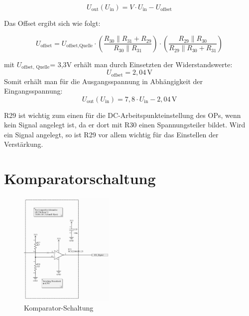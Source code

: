 \begin{equation}
    U_{\text{out}}(U_{\text{in}}) = V \cdot U_{\text{in}} - U_{\text{offset}}
\end{equation}

Das Offset ergibt sich wie folgt:

\begin{equation}
    U_{\text{offset}} = U_{\text{offset,Quelle}} \cdot \left( \frac{R_{30} \parallel R_{31} + R_{29}}{R_{30} \parallel R_{31}} \right) \cdot \left( \frac{R_{29} \parallel R_{30}}{R_{29} \parallel R_{30} + R_{31}} \right)
\end{equation}

mit $U_{\text{offset, Quelle}}$= 3,3V erhält man durch Einsetzten der Widerstandswerte:
\begin{equation}
    U_{\text{offset}} = 2{,}04\,\mathrm{V}
\end{equation}
Somit erhält man für die Ausgangsspannung in Abhängigkeit der Eingangsspannung:
\begin{equation}
    U_{\text{out}}(U_{\text{in}}) = 7{,}8 \cdot U_{\text{in}} - 2{,}04\,\mathrm{V}
\end{equation}





R29 ist wichtig zum einen für die DC-Arbeitspunkteinstellung des OPs, wenn kein Signal angelegt ist, da er dort mit R30 einen Spannungsteiler bildet.
Wird ein Signal angelegt, so ist R29 vor allem wichtig für das Einstellen der Verstärkung.


\section{Komparatorschaltung} %

\begin{figure}[H]
    \centering
    \includegraphics[width=0.4\textwidth]{Pictures/Komparator.png}
    \caption{Komparator-Schaltung}
    \label{fig:opamp_schaltung}
\end{figure}

